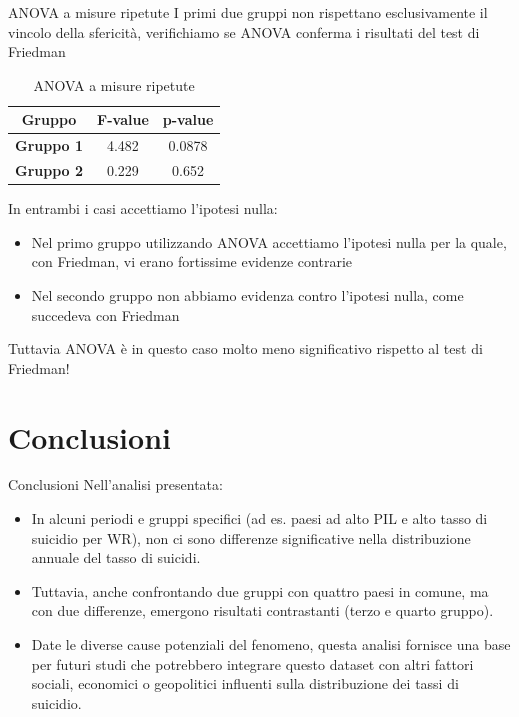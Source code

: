 \documentclass{beamer}
\begin{document}
\begin{frame}{ANOVA a misure ripetute}
	I primi due gruppi non rispettano esclusivamente il vincolo della sfericità,
	verifichiamo se ANOVA conferma i risultati del test di Friedman
	\begin{table}[htbp]
		\captionsetup{labelformat=empty} %
		\caption{ANOVA a misure ripetute}
		\begin{center}
		\begin{tabular}{|c|c|c|}
		\hline
		\textbf{Gruppo} & \textbf{F-value} & \textbf{p-value} \\
		\hline
		\textbf{Gruppo 1} & 4.482 & 0.0878 \\\cline{1-3}
		\textbf{Gruppo 2} & 0.229 & 0.652 \\\cline{1-3}
		\hline
		\end{tabular}
		\label{tab7}
		\end{center}
	\end{table}
	In entrambi i casi accettiamo l'ipotesi nulla:
	\begin{itemize}
		\item Nel primo gruppo utilizzando ANOVA accettiamo l'ipotesi nulla per la quale, con Friedman, vi erano fortissime evidenze contrarie
		\item Nel secondo gruppo non abbiamo evidenza contro l'ipotesi nulla, come succedeva con Friedman
	\end{itemize}
	Tuttavia ANOVA è in questo caso molto meno significativo rispetto al test di Friedman!
\end{frame}

\section{Conclusioni}

\begin{frame}{Conclusioni}
	Nell'analisi presentata:
	\begin{itemize}
		\item In alcuni periodi e gruppi specifici (ad es. paesi ad alto PIL e alto tasso di suicidio per WR), non ci sono differenze significative nella distribuzione annuale del tasso di suicidi.
		\item Tuttavia, anche confrontando due gruppi con quattro paesi in comune, ma con due differenze, emergono risultati contrastanti (terzo e quarto gruppo).
		\item Date le diverse cause potenziali del fenomeno, questa analisi fornisce una base per futuri studi che potrebbero integrare questo dataset con altri fattori sociali, economici o geopolitici influenti sulla distribuzione dei tassi di suicidio.
	\end{itemize}
\end{frame}
\end{document}
